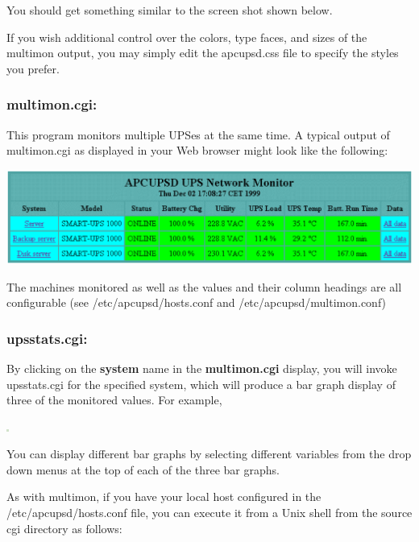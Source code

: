 {{{{{{{You should get something similar to the screen shot shown below.  

If you wish additional control over the colors, type faces, and sizes of the
multimon output, you may simply edit the apcupsd.css file to specify the styles 
you prefer.

\label{multimon_005fcgi}

\subsubsection*{multimon.cgi:}

\label{index-multimon-126}
\label{index-CGI_002c-multimon-127}
This program monitors multiple UPSes at the same time. A typical output of
multimon.cgi as displayed in your Web browser might look like the following:  

\includegraphics{./multimon.eps}  

The machines monitored as well as the values and their column headings are all
configurable (see /etc/apcupsd/hosts.conf and /etc/apcupsd/multimon.conf) 

\label{upsstats_005fcgi}

\subsubsection*{upsstats.cgi:}

\label{index-upsstats-128}
\label{index-CGI_002c-upsstats-129}
By clicking on the {\bf system} name in the {\bf multimon.cgi} display, you
will invoke upsstats.cgi for the specified system, which will produce a bar
graph display of three of the monitored values. For example,  

\includegraphics{./status.eps}  

You can display different bar graphs by selecting different variables from the
drop down menus at the top of each of the three bar graphs.  

As with multimon, if you have your local host configured in the
/etc/apcupsd/hosts.conf file, you can execute it from a Unix shell from the
source cgi directory as follows: 

}}}}}}}
